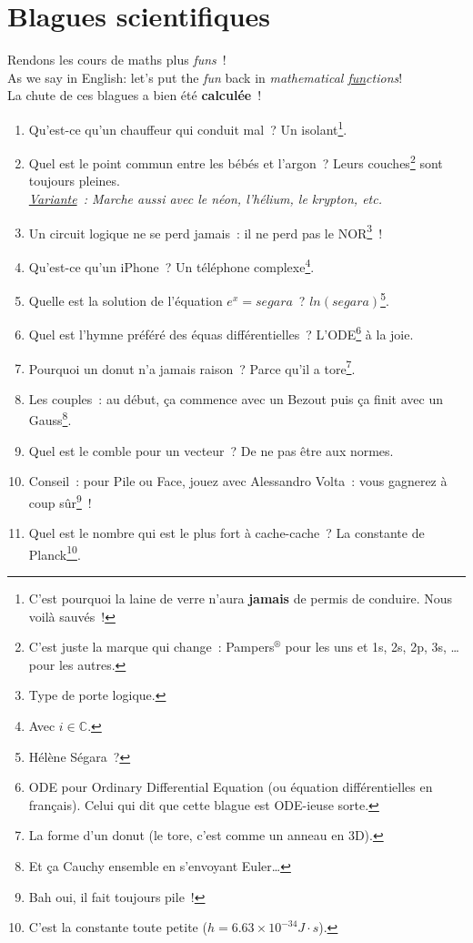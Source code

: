 \documentclass[10pt,a5paper,fullpage]{book}
\begin{document}
	\chapter{Blagues scientifiques}
	Rendons les cours de maths plus \textit{funs}~! 
	\\As we say in English: let's put the \textit{fun} back in \textit{mathematical \underline{fun}ctions}!  
	\\La chute de ces blagues a bien été \textbf{calculée}~!  
	\newpage
	\begin{enumerate}
		\item Qu’est-ce qu’un chauffeur qui conduit mal~? Un isolant\footnote{C’est pourquoi la laine de verre n’aura \textbf{jamais} de permis de conduire. Nous voilà sauvés~!}.
		\item Quel est le point commun entre les bébés et l’argon~? Leurs couches\footnote{C'est juste la marque qui change~: Pampers$ ^{\circledR}$ pour les uns et 1s, 2s, 2p, 3s, \ldots pour les autres.} sont toujours pleines.	
		\\\textit{\underline{Variante}~: Marche aussi avec le néon, l’hélium, le krypton, etc.}
		\item Un circuit logique ne se perd jamais~: il ne perd pas le NOR\footnote{Type de porte logique.}~!
		\item Qu’est-ce qu’un iPhone~? Un téléphone complexe\footnote{Avec $i \in \mathbb{C}$.}.
		\item Quelle est la solution de l’équation $e^x = segara$~? $ln(segara)$\footnote{Hélène Ségara~?}.
		\item Quel est l’hymne préféré des équas différentielles~? L’ODE\footnote{ODE pour Ordinary Differential Equation (ou équation différentielles en français). Celui qui dit que cette blague est ODE-ieuse sorte.} à la joie.
		\item Pourquoi un donut n’a jamais raison~? Parce qu’il a tore\footnote{La forme d’un donut (le tore, c’est comme un anneau en 3D).}.
		\item Les couples~: au début, ça commence avec un Bezout puis ça finit avec un Gauss\footnote{Et ça Cauchy ensemble en s’envoyant Euler\ldots}.
		\item Quel est le comble pour un vecteur~? De ne pas être aux normes. 
		\item Conseil~: pour Pile ou Face, jouez avec Alessandro Volta~: vous gagnerez à coup sûr\footnote{Bah oui, il fait toujours pile~!}~!
		\item Quel est le nombre qui est le plus fort à cache-cache~? La constante de Planck\footnote{C'est la constante toute petite ($h = 6.63 \times 10^{-34} J\cdot s$).}.

\end{enumerate}
\end{document}
